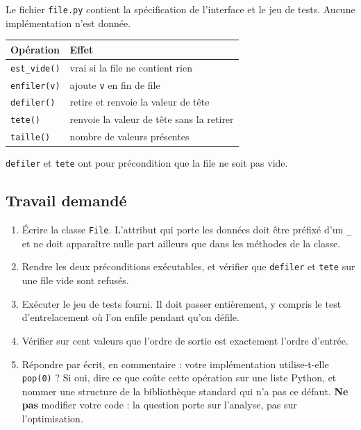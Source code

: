 Le fichier \lstinline{file.py} contient la spécification de l'interface et le
jeu de tests. Aucune implémentation n'est donnée.

\begin{center}
\begin{tabular}{|l|l|}
\hline
\textbf{Opération} & \textbf{Effet} \\
\hline
\texttt{est\_vide()} & vrai si la file ne contient rien \\
\hline
\texttt{enfiler(v)} & ajoute \texttt{v} en fin de file \\
\hline
\texttt{defiler()} & retire et renvoie la valeur de tête \\
\hline
\texttt{tete()} & renvoie la valeur de tête sans la retirer \\
\hline
\texttt{taille()} & nombre de valeurs présentes \\
\hline
\end{tabular}
\end{center}

\lstinline{defiler} et \lstinline{tete} ont pour précondition que la file ne
soit pas vide.

\subsection*{Travail demandé}

\begin{enumerate}
  \item Écrire la classe \lstinline{File}. L'attribut qui porte les données doit
    être préfixé d'un \lstinline{_} et ne doit apparaître nulle part ailleurs
    que dans les méthodes de la classe.

  \item Rendre les deux préconditions exécutables, et vérifier que
    \lstinline{defiler} et \lstinline{tete} sur une file vide sont refusés.

  \item Exécuter le jeu de tests fourni. Il doit passer entièrement, y compris
    le test d'entrelacement où l'on enfile pendant qu'on défile.

  \item Vérifier sur cent valeurs que l'ordre de sortie est exactement l'ordre
    d'entrée.

  \item Répondre par écrit, en commentaire : votre implémentation utilise-t-elle
    \lstinline{pop(0)} ? Si oui, dire ce que coûte cette opération sur une liste
    Python, et nommer une structure de la bibliothèque standard qui n'a pas ce
    défaut. \textbf{Ne pas} modifier votre code : la question porte sur
    l'analyse, pas sur l'optimisation.
\end{enumerate}

